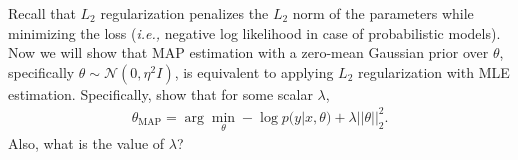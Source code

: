 \item  {} Recall that $L_2$ regularization penalizes the $L_2$ norm
of the parameters while minimizing the loss (\emph{i.e.,} negative log likelihood in case of
probabilistic models).
Now we will show that MAP estimation with a zero-mean
Gaussian prior over $\theta$, specifically $\theta \sim \mathcal{N}(0, \eta^2I)$,
is equivalent to applying $L_2$ regularization with MLE estimation. Specifically,
show that  for some scalar $\lambda$, 
\begin{align}
\theta_{\text{MAP}} = \arg\min_\theta - \log p(y|x,\theta) + \lambda||\theta||^2_2.\label{eqn:1}
\end{align}
Also, what is the value of $\lambda$?

